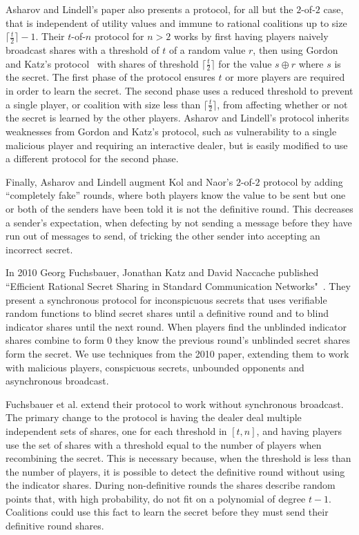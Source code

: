 \documentclass[12pt]{dalcsthesis}
\begin{document}
Asharov and Lindell's paper also presents a protocol, for all but the $2$-of-$2$ case, that is independent of utility values and immune to rational coalitions up to size $\lceil \frac{t}{2} \rceil - 1$. Their $t$-of-$n$ protocol for $n > 2$ works by first having players naively broadcast shares with a threshold of $t$ of a random value $r$, then using Gordon and Katz's protocol~\cite{gordon06} with shares of threshold $\lceil \frac{t}{2} \rceil$ for the value $s \oplus r$ where $s$ is the secret. The first phase of the protocol ensures $t$ or more players are required in order to learn the secret. The second phase uses a reduced threshold to prevent a single player, or coalition with size less than $\lceil \frac{t}{2} \rceil$, from affecting whether or not the secret is learned by the other players. Asharov and Lindell's protocol inherits weaknesses from Gordon and Katz's protocol, such as vulnerability to a single malicious player and requiring an interactive dealer, but is easily modified to use a different protocol for the second phase.

Finally, Asharov and Lindell augment Kol and Naor's $2$-of-$2$ protocol by adding ``completely fake'' rounds, where both players know the value to be sent but one or both of the senders have been told it is not the definitive round. This decreases a sender's expectation, when defecting by not sending a message before they have run out of messages to send, of tricking the other sender into accepting an incorrect secret.

In 2010 Georg Fuchsbauer, Jonathan Katz and David Naccache published ``Efficient Rational Secret Sharing in Standard Communication Networks"~\cite{fuch10}. They present a synchronous protocol for inconspicuous secrets that uses verifiable random functions to blind secret shares until a definitive round and to blind indicator shares until the next round. When players find the unblinded indicator shares combine to form 0 they know the previous round's unblinded secret shares form the secret. We use techniques from the 2010 paper, extending them to work with malicious players, conspicuous secrets, unbounded opponents and asynchronous broadcast.

Fuchsbauer et al. extend their protocol to work without synchronous broadcast. The primary change to the protocol is having the dealer deal multiple independent sets of shares, one for each threshold in $[t, n]$, and having players use the set of shares with a threshold equal to the number of players when recombining the secret. This is necessary because, when the threshold is less than the number of players, it is possible to detect the definitive round without using the indicator shares. During non-definitive rounds the shares describe random points that, with high probability, do not fit on a polynomial of degree $t-1$. Coalitions could use this fact to learn the secret before they must send their definitive round shares.
\end{document}
